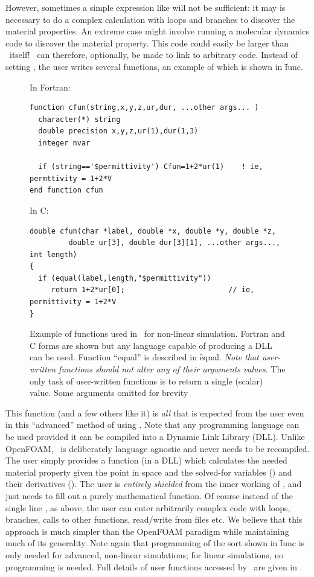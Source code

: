 \documentclass[a4paper,twoside,11pt]{book}
\begin{document}
However, sometimes a simple expression like  will not be
sufficient: it may is necessary to do a complex calculation with loops
and branches to discover the material properties. An extreme case
might involve running a molecular dynamics code to discover the
material property. This code could easily be larger than
\zinc\ itself!  \zinc\ can therefore, optionally, be made to link to
arbitrary code. Instead of setting , the user writes
several functions, an example of which is shown in \f{func}.

\begin{figure}
In Fortran:
\begin{verbatim}
function cfun(string,x,y,z,ur,dur, ...other args... )
  character(*) string
  double precision x,y,z,ur(1),dur(1,3)
  integer nvar

  if (string=='$permittivity') Cfun=1+2*ur(1)    ! ie, permttivity = 1+2*V
end function cfun
\end{verbatim}  
In C:
\begin{verbatim}
double cfun(char *label, double *x, double *y, double *z, 
	     double ur[3], double dur[3][1], ...other args..., int length)
{
  if (equal(label,length,"$permittivity"))
     return 1+2*ur[0];                        // ie, permittivity = 1+2*V
}
\end{verbatim}
\caption{Example of functions used in \zinc\ for non-linear
  simulation. Fortran and C forms are shown but any language capable
  of producing a DLL can be used. Function ``equal'' is described in
  \f{equal}. \emph{Note that user-written functions should not alter any of
  their arguments values}. The only task of user-written functions is
  to return a single (scalar) value. Some arguments omitted for brevity}
\label{func}
\end{figure}

This function (and a few others like it) is \emph{all} that is
expected from the user even in this ``advanced'' method of using
\zinc. Note that any programming language can be used provided it can
be compiled into a Dynamic Link Library (DLL). Unlike OpenFOAM,
\zinc\ is deliberately language agnostic and never needs to be
recompiled. The user simply provides a function (in a DLL) which
calculates the needed material property given the point in space
 and the solved-for variables () and their
derivatives (). The user is \emph{entirely shielded} from the
inner working of \zinc, and just needs to fill out a purely
mathematical function. Of course instead of the single line
, as above, the user can enter arbitrarily complex
code with loops, branches, calls to other functions, read/write from
files etc. We believe that this approach is much simpler than the
OpenFOAM paradigm while maintaining much of its generality. Note again
that programming of the sort shown in \f{func} is only needed for
advanced, non-linear simulations; for linear simulations, no
programming is needed. Full details of user functions accessed by
\zinc\ are given in .
\end{document}
